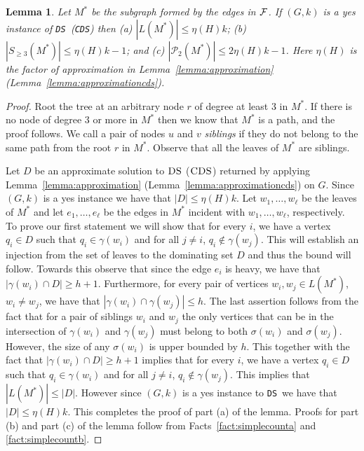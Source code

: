 \documentclass[11pt]{article}
\newtheorem{lemma}{Lemma}
\newcommand{\tDS}{{\texttt{\sc DS}}}
\newcommand{\tCDS}{{\texttt{\sc CDS}}}
\begin{document}
\begin{lemma}
\label{lemma:boundingleavesandpaths}
Let $M^*$ be the subgraph formed by the edges in $\cal F$. 
If $(G,k)$ is a yes instance of \tDS \, (\tCDS) then (a) $|L(M^*)| \leq \eta(H) k$;  
(b) $|S_{\geq 3}(M^*)|\leq \eta(H) k-1$; and 
(c)  $|\mathscr{P}_2(M^*)|\leq 2 \eta(H) k-1$.  
Here $\eta(H)$ is the factor of approximation in Lemma~\ref{lemma:approximation} (Lemma~\ref{lemma:approximationcds}). 
\end{lemma}
\begin{proof}
Root the tree at an arbitrary node $r$ of degree at least $3$ in $M^*$. If there is no node of degree $3$ 
or more in $M^*$ then we know that  $M^*$ is a path,  and the proof follows. 
We call a pair of nodes $u$ and $v$ {\em siblings} if they do not 
belong to the same path from the root $r$ in $M^*$. Observe that all the leaves of $M^*$ are siblings. 

 Let $D$ be an approximate solution to $\tDS$ ($\tCDS$) returned by applying Lemma~\ref{lemma:approximation} (Lemma~\ref{lemma:approximationcds}) on $G$. Since  $(G,k)$ is a yes instance we have that $|D|\leq  \eta(H) k$. 
Let $w_1,\ldots,w_\ell$ be the leaves of $M^*$ and let $e_1,\ldots,e_\ell$ be the  edges in $M^*$ incident 
with   $w_1,\ldots,w_\ell$, respectively.  To prove our first statement we will show that for every $i$, we have a vertex 
 $q_i\in D$  such that $q_i\in \gamma(w_i)$ and for  all $j\neq i$, $q_i\notin \gamma(w_j)$. This will establish an 
 injection from the set of leaves to the dominating set $D$ and thus the bound will follow. Towards this observe that 
 since the edge $e_i$ is heavy,  we have that $|\gamma(w_i)\cap D|\geq h+1$.  
Furthermore, for every pair of 
 vertices $w_i,w_j\in L(M^*)$, $w_i\neq w_j$, we have that 
 $|\gamma(w_i)\cap \gamma(w_j)|\leq h$. The last assertion  follows from the fact that for a pair of siblings $w_i$ and $w_j$ 
  the only vertices that  can be in the intersection of  $\gamma(w_i)$ and $\gamma(w_j)$ must belong to both $\sigma(w_i)$ and 
  $\sigma(w_j)$. However, the size of any $\sigma(w_i)$ is upper bounded by $h$. This together with the fact that 
  $|\gamma(w_i)\cap D|\geq h+1$ implies that for every $i$, we have a vertex $q_i\in D$  such that 
 $q_i\in \gamma(w_i)$ and for  all $j\neq i$, $q_i\notin \gamma(w_j)$.  This implies that $|L(M^*)|\leq |D|$. However since $(G,k)$ is a yes instance to \tDS \, we have that $|D|\leq \eta(H)k$. This completes the proof of part (a)  of the lemma. 
Proofs for part (b) and part (c) of the lemma follow from Facts~\ref{fact:simplecounta} and \ref{fact:simplecountb}. 
\end{proof}
\end{document}
